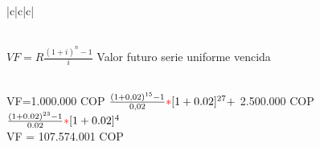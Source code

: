 \begin{center}
\begin{longtable}[H]{|c|c|c|}
		
		
    \\ \hline
 {$VF=R\frac{(1+i)^{n}-1}{i}$ Valor futuro serie uniforme vencida}   \\ \hline	
	
       \\ \hline
{VF=1.000.000 COP $\frac{(1+0,02)^{15}-1}{0,02}\textcolor{red}*[1+0.02]^{27} +$ 2.500.000 COP $\frac{(1+0.02)^{23}-1}{0.02}\textcolor{red}*[1+0.02]^{4}$}\\
{VF = 107.574.001 COP}\\ \hline
		
   \\ \hline
  \\ \hline
		
		
	\end{longtable}
\end{center}


